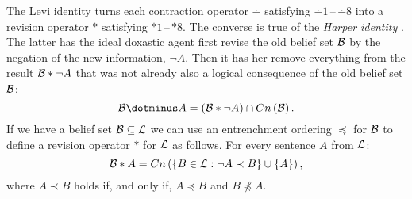 The Levi identity turns each contraction operator $\dotminus$ satisfying $\dotminus 1$\,--\,$\dotminus 8$ into a revision operator $*$ satisfying $*1$\,--\,$*8$. The converse is true of the \emph{Harper identity} \citep{h76a}. The latter has the ideal doxastic agent first revise the old belief set $\cal B$ by the negation of the new information, $\neg A$. Then it has her remove everything from the result $\begin{cal}B\end{cal}*\neg A$ that was not already also a logical consequence of the old belief set $\cal B$:
$$\begin{cal}B\end{cal}\dotminus A=\left(\begin{cal}B\end{cal}*\neg A\right)\cap Cn\left(\cal B\right).$$
If we have a belief set $\cal B\subseteq L$ we can use an entrenchment ordering $\preceq$ for $\cal B$ to define a revision operator $*$ for $\cal L$ as follows. For every sentence $A$ from $\cal L$:
$$\begin{cal}B\end{cal}*A=Cn\left(\left\{B\in\begin{cal}L\end{cal}:\neg A\prec B\right\}\cup\left\{A\right\}\right),$$
where $A\prec B$ holds if, and only if, $A\preceq B$ and $B\not\preceq A$.

